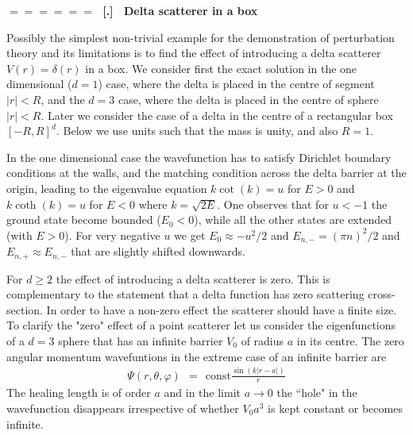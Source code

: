 \documentclass[onecolumn,fleqn]{revtex4}
\newcommand{\const}{\mathrm{const}}
\newcommand{\beq}{\begin{eqnarray}}
\newcommand{\eeq}{\end{eqnarray}}
\renewcommand{\thesubsection}{\arabic{subsection}}
\renewcommand{\thesubsubsection}{\arabic{subsubsection}}
\newcommand{\sheadC}[1]
{
\addtocounter{subsubsection}{1}
\vspace{5mm}
{\Large\bf $=\!=\!=\!=\!=\!=\;$ [\thesubsection.\thesubsubsection] \ #1}  
\nopagebreak
\phantomsection
}
\begin{document}
\newpage
\sheadC{Delta scatterer in a box}

Possibly the simplest non-trivial example for the demonstration 
of perturbation theory and its limitations is to find the 
effect of introducing a delta scatterer $V(r)=\delta(r)$ in a box. 
We consider first the exact solution in the 
one dimensional ($d=1$) case, where the delta is placed in 
the centre of segment $|r|<R$, and the $d=3$ case, 
where the delta is placed in the centre of sphere $|r|<R$.
Later we consider the case of a delta in the centre 
of a rectangular box ${[-R,R]^d}$. Below we use units 
such that the mass is unity, and also ${R=1}$.     


In the one dimensional case the wavefunction 
has to satisfy Dirichlet boundary conditions 
at the walls, and the matching condition across 
the delta barrier at the origin, leading to 
the eigenvalue equation $k\cot(k)=u$ for $E>0$ 
and $k\coth(k)=u$ for $E<0$ where ${k=\sqrt{2E}}$. 
One observes that for ${u<-1}$ the ground state 
become bounded ($E_0<0$), while all the other  
states are extended (with ${E>0}$). For very 
negative $u$ we get $E_0 \approx -u^2/2$ 
and  $E_{n,-} = (\pi n)^2/2$ and $E_{n,+}\approx E_{n,-}$
that are slightly shifted downwards.   

For $d\ge2$ the effect of introducing a delta scatterer 
is zero. This is complementary to the statement that a delta 
function has zero scattering cross-section. 
In order to have a non-zero effect the scatterer 
should have a finite size. 
To clarify the "zero" effect of a point scatterer 
let us consider the eigenfunctions of a ${d=3}$ sphere 
that has an infinite barrier $V_0$ of radius $a$ in its centre.
The zero angular momentum wavefuntions in the extreme case 
of an infinite barrier are
\beq 
\Psi(r,\theta,\varphi) \ \ = \ \ \const \frac{\sin(k|r-a|)}{r}  
\eeq
The healing length is of order $a$ and in 
the limit $a\rightarrow0$ the ``hole" 
in the wavefunction disappears irrespective 
of whether $V_0a^3$ is kept constant or becomes infinite.
\end{document}
